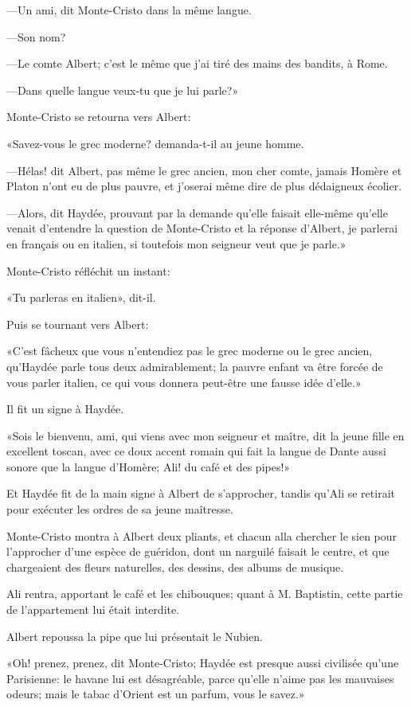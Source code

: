 —Un ami, dit Monte-Cristo dans la même langue. 

—Son nom? 

—Le comte Albert; c'est le même que j'ai tiré des mains des bandits, à Rome. 

—Dans quelle langue veux-tu que je lui parle?» 

Monte-Cristo se retourna vers Albert: 

«Savez-vous le grec moderne? demanda-t-il au jeune homme. 

—Hélas! dit Albert, pas même le grec ancien, mon cher comte, jamais Homère et Platon n'ont eu de plus pauvre, et j'oserai même dire de plus dédaigneux écolier. 

—Alors, dit Haydée, prouvant par la demande qu'elle faisait elle-même qu'elle venait d'entendre la question de Monte-Cristo et la réponse d'Albert, je parlerai en français ou en italien, si toutefois mon seigneur veut que je parle.» 

Monte-Cristo réfléchit un instant: 

«Tu parleras en italien», dit-il. 

Puis se tournant vers Albert: 

«C'est fâcheux que vous n'entendiez pas le grec moderne ou le grec ancien, qu'Haydée parle tous deux admirablement; la pauvre enfant va être forcée de vous parler italien, ce qui vous donnera peut-être une fausse idée d'elle.» 

Il fit un signe à Haydée. 

«Sois le bienvenu, ami, qui viens avec mon seigneur et maître, dit la jeune fille en excellent toscan, avec ce doux accent romain qui fait la langue de Dante aussi sonore que la langue d'Homère; Ali! du café et des pipes!» 

Et Haydée fit de la main signe à Albert de s'approcher, tandis qu'Ali se retirait pour exécuter les ordres de sa jeune maîtresse. 

Monte-Cristo montra à Albert deux pliants, et chacun alla chercher le sien pour l'approcher d'une espèce de guéridon, dont un narguilé faisait le centre, et que chargeaient des fleurs naturelles, des dessins, des albums de musique. 

Ali rentra, apportant le café et les chibouques; quant à M. Baptistin, cette partie de l'appartement lui était interdite. 

Albert repoussa la pipe que lui présentait le Nubien. 

«Oh! prenez, prenez, dit Monte-Cristo; Haydée est presque aussi civilisée qu'une Parisienne: le havane lui est désagréable, parce qu'elle n'aime pas les mauvaises odeurs; mais le tabac d'Orient est un parfum, vous le savez.» 

